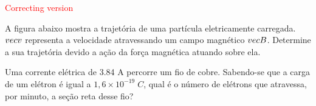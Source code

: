 \documentclass[12pt, addpoints]{exam}
\begin{document}
        \begin{center}
\textcolor{red}{\emph\Large Correcting version}\end{center}
\begin{questions}
\begin{multicols*}{2}
\question[20] A ﬁgura abaixo mostra a trajetória de uma partícula eletricamente carregada. $\\vec{{v}}$ representa a velocidade atravessando um campo magnético $\\vec{{B}}$. Determine a sua trajetória devido a ação da força magnética atuando sobre ela.
        
        \begin{center}
            \begin{minipage}[c]{0.5\linewidth}
            \end{minipage}
        \end{center}

        

\begin{oneparchoices}
\end{oneparchoices}
\question[20] Uma corrente elétrica de    3.84 A percorre um ﬁo de cobre. Sabendo-se que a carga de um elétron é igual a $1,6\times 10^{-19}\;C$, qual é o número de elétrons que atravessa, por minuto, a seção reta desse ﬁo?


\end{multicols*}
\end{questions}
\end{document}
